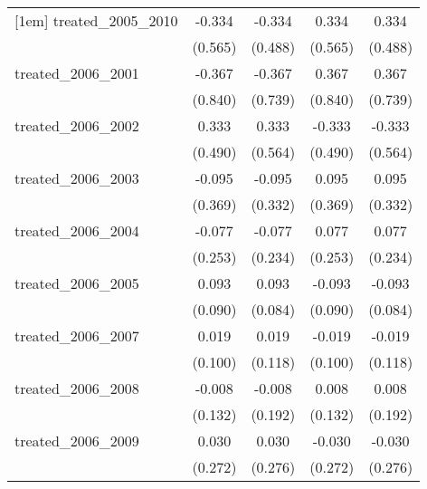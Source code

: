 {\begin{tabular}{l*{4}{c}}
[1em]
treated\_2005\_2010&      -0.334         &      -0.334         &       0.334         &       0.334         \\
            &     (0.565)         &     (0.488)         &     (0.565)         &     (0.488)         \\
[1em]
treated\_2006\_2001&      -0.367         &      -0.367         &       0.367         &       0.367         \\
            &     (0.840)         &     (0.739)         &     (0.840)         &     (0.739)         \\
[1em]
treated\_2006\_2002&       0.333         &       0.333         &      -0.333         &      -0.333         \\
            &     (0.490)         &     (0.564)         &     (0.490)         &     (0.564)         \\
[1em]
treated\_2006\_2003&      -0.095         &      -0.095         &       0.095         &       0.095         \\
            &     (0.369)         &     (0.332)         &     (0.369)         &     (0.332)         \\
[1em]
treated\_2006\_2004&      -0.077         &      -0.077         &       0.077         &       0.077         \\
            &     (0.253)         &     (0.234)         &     (0.253)         &     (0.234)         \\
[1em]
treated\_2006\_2005&       0.093         &       0.093         &      -0.093         &      -0.093         \\
            &     (0.090)         &     (0.084)         &     (0.090)         &     (0.084)         \\
[1em]
treated\_2006\_2007&       0.019         &       0.019         &      -0.019         &      -0.019         \\
            &     (0.100)         &     (0.118)         &     (0.100)         &     (0.118)         \\
[1em]
treated\_2006\_2008&      -0.008         &      -0.008         &       0.008         &       0.008         \\
            &     (0.132)         &     (0.192)         &     (0.132)         &     (0.192)         \\
[1em]
treated\_2006\_2009&       0.030         &       0.030         &      -0.030         &      -0.030         \\
            &     (0.272)         &     (0.276)         &     (0.272)         &     (0.276)         \\

\end{tabular}}
